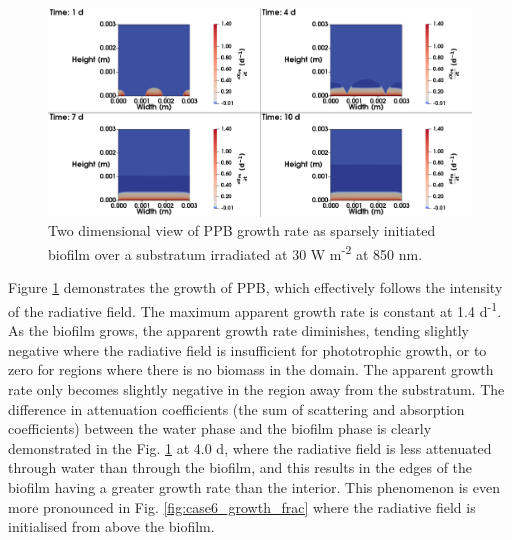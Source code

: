 \begin{figure}[H]
    \centering
    \hspace*{-1cm}\includegraphics[width=1.1\textwidth,height=0.4\textheight]{Chap4/methods/data/figures/case5_growth_frac.png}
    \caption{Two dimensional view of PPB growth rate as sparsely initiated biofilm over a substratum irradiated at 30 W m\textsuperscript{-2} at 850 nm.} 
    \label{fig:case5_growth_frac}
\end{figure}

Figure \ref{fig:case5_growth_frac} demonstrates the growth of PPB, which effectively follows the intensity of the radiative field. The maximum apparent growth rate is constant at 1.4 d\textsuperscript{-1}. As the biofilm grows, the apparent growth rate diminishes, tending slightly negative where the radiative field is insufficient for phototrophic growth, or to zero for regions where there is no biomass in the domain. The apparent growth rate only becomes slightly negative in the region away from the substratum. The difference in attenuation coefficients (the sum of scattering and absorption coefficients) between the water phase and the biofilm phase is clearly demonstrated in the Fig. \ref{fig:case5_growth_frac} at 4.0 d, where the radiative field is less attenuated through water than through the biofilm, and this results in the edges of the biofilm having a greater growth rate than the interior. This phenomenon is even more pronounced in Fig. \ref{fig:case6_growth_frac} where the radiative field is initialised from above the biofilm. 

